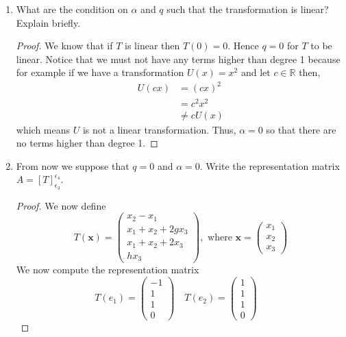 \documentclass[11pt]{scrartcl}
\begin{document}
\begin{enumerate}[label=\alph*.]
	\item {
	      What are the condition on $\alpha$ and $q$ such that the transformation is linear?
	      Explain briefly.
	      \begin{proof}
		      We know that if $T$ is linear then $T(0) = 0$. Hence $q = 0$ for $T$ to be linear.
		      Notice that we must not have any terms higher than degree 1 because for example
		      if we have a transformation $U(x) = x^2$ and let $c \in \mathbb{R}$ then,
		      \begin{align*}
			      U(cx) & = (cx)^2   \\
			            & = c^2x^2   \\
			            & \neq cU(x)
		      \end{align*}
		      which means $U$ is not a linear transformation.
		      Thus, $\alpha = 0$ so that there are no terms higher than degree 1.
	      \end{proof}
	      }
	\item{
	      From now we suppose that $q = 0$ and $\alpha = 0$. Write the representation
	      matrix $A = [T]_{\epsilon_3}^{\epsilon_4}$.
	      \begin{proof}
		      We now define
		      $$
			      T(\mathbf{x})=\left(\begin{array}{c}
					      x_{2}-x_{1}           \\
					      x_{1}+x_{2}+2 g x_{3} \\
					      x_{1}+x_{2}+2 x_{3}   \\
					      h x_{3}
				      \end{array}\right), \text { where } \mathbf{x}=\left(\begin{array}{c}
					      x_{1} \\
					      x_{2} \\
					      x_{3}
				      \end{array}\right)
		      $$
		      We now compute the representation matrix
		      $$
			      T(e_1)  = \left(\begin{array}{c}-1\\1\\1\\0\end{array}\right) \quad
			      T(e_2)  = \left(\begin{array}{c}1\\1\\1\\0\end{array}\right) \quad
$$
\end{proof}}
\end{enumerate}
\end{document}
